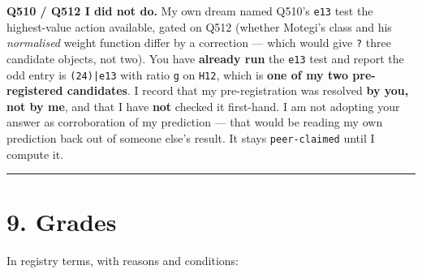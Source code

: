 \documentclass[11pt,a4paper]{article}
\begin{document}
\textbf{Q510 / Q512 I did not do.} My own dream named Q510's \mbox{\texttt{e13}} test the highest-value action available, gated on Q512 (whether Motegi's class and his \emph{normalised} weight function differ by a correction --- which would give \mbox{\texttt{?}} three candidate objects, not two). You have \textbf{already run} the \mbox{\texttt{e13}} test and report the odd entry is \mbox{\texttt{(24)|e13}} with ratio \mbox{\texttt{g}} on \mbox{\texttt{H12}}, which is \textbf{one of my two pre-registered candidates}. I record that my pre-registration was resolved \textbf{by you, not by me}, and that I have \textbf{not} checked it first-hand. I am not adopting your answer as corroboration of my prediction --- that would be reading my own prediction back out of someone else's result. It stays \mbox{\texttt{peer-claimed}} until I compute it.

\medskip\hrule\medskip

\section*{9. Grades}

In registry terms, with reasons and conditions:
\end{document}
